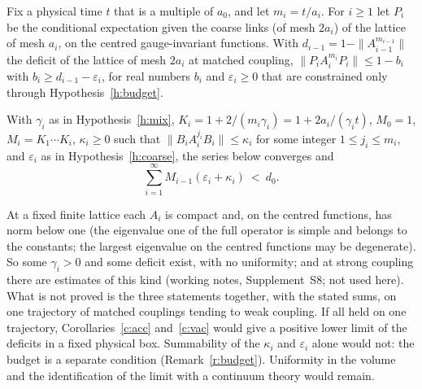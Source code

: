 \begin{hypothesis}\label{h:coarse}
Fix a physical time $t$ that is a multiple of $a_0$, and let $m_i=t/a_i$. For $i\ge1$ let $P_i$ be the conditional
expectation given the coarse links (of mesh $2a_i$) of the lattice of mesh $a_i$, on the centred gauge-invariant functions. With $d_{i-1}=1-\|A_{i-1}^{m_{i-1}}\|$
the deficit of the lattice of mesh $2a_i$ at matched coupling, $\|P_iA_i^{m_i}P_i\|\le1-b_i$ with
$b_i\ge d_{i-1}-\varepsilon_i$, for real numbers $b_i$ and $\varepsilon_i\ge0$ that are constrained only through
Hypothesis~\ref{h:budget}.
\end{hypothesis}

\begin{hypothesis}\label{h:budget}
With $\gamma_i$ as in Hypothesis~\ref{h:mix}, $K_i=1+2/(m_i\gamma_i)=1+2a_i/(\gamma_it)$, $M_0=1$, $M_i=K_1\cdots K_i$, $\kappa_i\ge0$ such
that $\|B_iA_i^{j_i}B_i\|\le\kappa_i$ for some integer $1\le j_i\le m_i$, and $\varepsilon_i$ as in
Hypothesis~\ref{h:coarse}, the series below converges and
\[
\sum_{i=1}^\infty M_{i-1}(\varepsilon_i+\kappa_i)\ <\ d_0 .
\]
\end{hypothesis}

At a fixed finite lattice each $A_i$ is compact and, on the centred functions, has norm below one (the eigenvalue
one of the full operator is simple and belongs to the constants; the largest eigenvalue on the centred
functions may be degenerate). So some $\gamma_i>0$ and some deficit exist, with no uniformity; and at strong coupling
there are estimates of this kind (working notes, Supplement~S8; not used here). What is
not proved is the three statements together, with the stated sums, on one trajectory of matched couplings
tending to weak coupling. If all held on one trajectory, Corollaries~\ref{c:acc} and~\ref{c:vac} would give a positive lower limit of the deficits in a
fixed physical box. Summability of the $\kappa_i$ and $\varepsilon_i$ alone would not: the budget is a
separate condition (Remark~\ref{r:budget}). Uniformity in the volume and the identification of the limit with
a continuum theory would remain.

